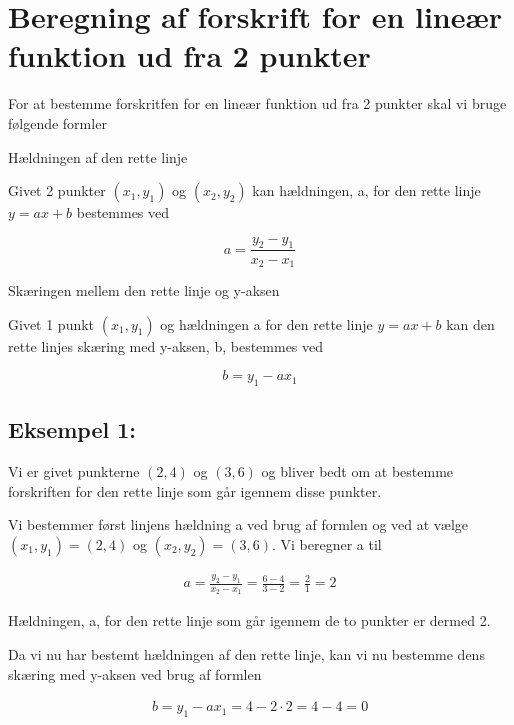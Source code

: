 \section*{Beregning af forskrift for en lineær funktion ud fra 2 punkter}

For at bestemme forskritfen for en lineær funktion ud fra 2 punkter skal vi bruge følgende formler


\begin{frm-thm}{Hældningen af den rette linje}

Givet 2 punkter $(x_1, y_1)$ og $(x_2, y_2)$ kan hældningen, a, for den rette linje $y = ax + b$ bestemmes ved

\[a = \frac{y_2 - y_1}{x_2 - x_1}\]


\end{frm-thm}

\begin{frm-thm}{Skæringen mellem den rette linje og y-aksen}

Givet 1 punkt $(x_1, y_1)$ og hældningen a for den rette linje $y = ax + b$ kan den rette linjes skæring med y-aksen, b, bestemmes ved

\[b = y_1 - ax_1\]

\end{frm-thm}



\subsection*{Eksempel 1:}

Vi er givet punkterne $(2,4)$ og $(3,6)$ og bliver bedt om at bestemme forskriften for den rette linje som går igennem disse punkter.

Vi bestemmer først linjens hældning a ved brug af formlen og ved at vælge $(x_1, y_1) = (2,4)$ og $(x_2, y_2) = (3,6)$. Vi beregner a til

\begin{align*}
a = \frac{y_2 - y_1}{x_2 - x_1} = \frac{6 - 4}{3 - 2} = \frac{2}{1} = 2
\end{align*}

Hældningen, a, for den rette linje som går igennem de to punkter er dermed 2. 

Da vi nu har bestemt hældningen af den rette linje, kan vi nu bestemme dens skæring med y-aksen ved brug af formlen

\begin{align*}
b = y_1 - ax_1 = 4 - 2\cdot 2 = 4 - 4 = 0
\end{align*}


